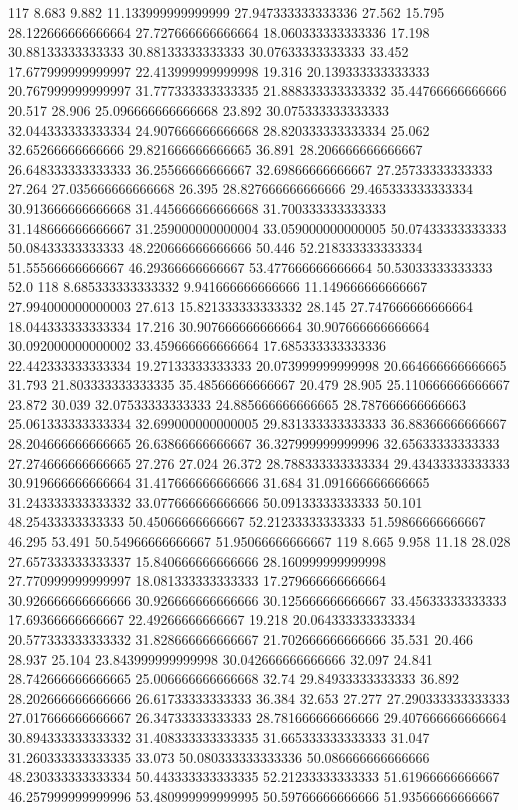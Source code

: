 117 8.683 9.882 11.133999999999999 27.947333333333336 27.562 15.795 28.122666666666664 27.727666666666664 18.060333333333336 17.198 30.88133333333333 30.88133333333333 30.07633333333333 33.452 17.677999999999997 22.413999999999998 19.316 20.139333333333333 20.767999999999997 31.777333333333335 21.888333333333332 35.44766666666666 20.517 28.906 25.096666666666668 23.892 30.075333333333333 32.044333333333334 24.907666666666668 28.820333333333334 25.062 32.65266666666666 29.821666666666665 36.891 28.206666666666667 26.648333333333333 36.25566666666667 32.69866666666667 27.25733333333333 27.264 27.035666666666668 26.395 28.827666666666666 29.465333333333334 30.913666666666668 31.445666666666668 31.700333333333333 31.148666666666667 31.259000000000004 33.059000000000005 50.07433333333333 50.08433333333333 48.220666666666666 50.446 52.218333333333334 51.55566666666667 46.29366666666667 53.477666666666664 50.53033333333333 52.0
118 8.685333333333332 9.941666666666666 11.149666666666667 27.994000000000003 27.613 15.821333333333332 28.145 27.747666666666664 18.044333333333334 17.216 30.907666666666664 30.907666666666664 30.092000000000002 33.459666666666664 17.685333333333336 22.442333333333334 19.27133333333333 20.073999999999998 20.664666666666665 31.793 21.803333333333335 35.48566666666667 20.479 28.905 25.110666666666667 23.872 30.039 32.07533333333333 24.885666666666665 28.787666666666663 25.061333333333334 32.699000000000005 29.831333333333333 36.88366666666667 28.204666666666665 26.63866666666667 36.327999999999996 32.65633333333333 27.274666666666665 27.276 27.024 26.372 28.788333333333334 29.43433333333333 30.919666666666664 31.417666666666666 31.684 31.091666666666665 31.243333333333332 33.077666666666666 50.09133333333333 50.101 48.25433333333333 50.45066666666667 52.21233333333333 51.59866666666667 46.295 53.491 50.54966666666667 51.95066666666667
119 8.665 9.958 11.18 28.028 27.657333333333337 15.840666666666666 28.160999999999998 27.770999999999997 18.081333333333333 17.279666666666664 30.926666666666666 30.926666666666666 30.125666666666667 33.45633333333333 17.69366666666667 22.49266666666667 19.218 20.064333333333334 20.577333333333332 31.828666666666667 21.702666666666666 35.531 20.466 28.937 25.104 23.843999999999998 30.042666666666666 32.097 24.841 28.742666666666665 25.006666666666668 32.74 29.84933333333333 36.892 28.202666666666666 26.61733333333333 36.384 32.653 27.277 27.290333333333333 27.017666666666667 26.34733333333333 28.781666666666666 29.407666666666664 30.894333333333332 31.408333333333335 31.665333333333333 31.047 31.260333333333335 33.073 50.080333333333336 50.086666666666666 48.230333333333334 50.443333333333335 52.21233333333333 51.61966666666667 46.257999999999996 53.480999999999995 50.59766666666666 51.93566666666667
